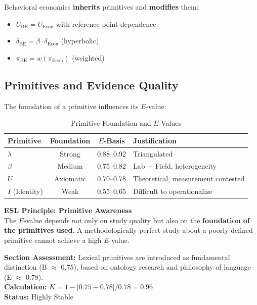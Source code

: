 \documentclass[11pt,a4paper]{article}
\begin{document}
Behavioral economics \textbf{inherits} primitives and \textbf{modifies} them:
\begin{itemize}
    \item $U_{\text{BE}} = U_{\text{Econ}}$ with reference point dependence
    \item $\delta_{\text{BE}} = \beta \cdot \delta_{\text{Econ}}$ (hyperbolic)
    \item $\pi_{\text{BE}} = w(\pi_{\text{Econ}})$ (weighted)
\end{itemize}

\subsection{Primitives and Evidence Quality}

The foundation of a primitive influences its $E$-value:

\begin{table}[h]
\centering
\caption{Primitive Foundation and $E$-Values}
\label{tab:primitive-E}
\begin{tabular}{lccp{4.5cm}}
\toprule
\textbf{Primitive} & \textbf{Foundation} & \textbf{$E$-Basis} & \textbf{Justification} \\
\midrule
$\lambda$ & Strong & 0.88--0.92 & Triangulated \\
$\beta$ & Medium & 0.75--0.82 & Lab + Field, heterogeneity \\
$U$ & Axiomatic & 0.70--0.78 & Theoretical, measurement contested \\
$I$ (Identity) & Weak & 0.55--0.65 & Difficult to operationalize \\
\bottomrule
\end{tabular}
\end{table}

\begin{insightbox}
\textbf{ESL Principle: Primitive Awareness} \\
The $E$-value depends not only on study quality but also on the \textbf{foundation of the primitives used}. A methodologically perfect study about a poorly defined primitive cannot achieve a high $E$-value.
\end{insightbox}

\begin{eslbox}
\textbf{Section Assessment:} Lexical primitives are introduced as fundamental distinction (B $\approx$ 0.75), based on ontology research and philosophy of language (E $\approx$ 0.78). \\[0.3em]
\textbf{Calculation:} $K = 1 - |0.75 - 0.78| / 0.78 = 0.96$ \\
\textbf{Status:} Highly Stable
\end{eslbox}
\end{document}
